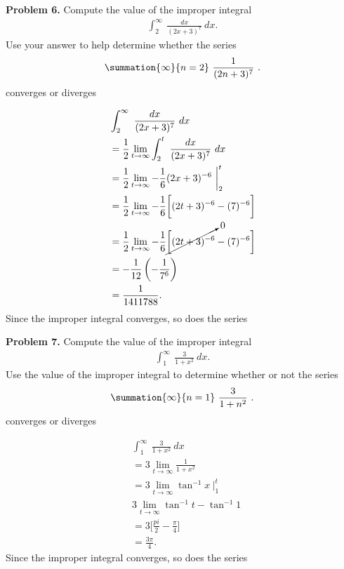 \documentclass{report}
\begin{document}
   \pagebreak \bigbreak \noindent 
   \begin{mdframed}
       \textbf{Problem 6.} Compute the value of the improper integral
       \begin{align*}
           \int_{2}^{\infty}\ \frac{dx}{(2x+3)^{7}}\ dx
       .\end{align*}
       Use your answer to help determine whether the series 
       \begin{align*}
           \summation{\infty}{n=2}\ \frac{1}{(2n+3)^{7}}\ 
       .\end{align*}
       converges or diverges
   \end{mdframed}
   \begin{align*}
       &\int_{2}^{\infty}\ \frac{dx}{(2x+3)^{7}}\ dx \\
       &=\frac{1}{2}\lim\limits_{t \to \infty}{\int_{2}^{t}\ \frac{dx}{(2x+3)^{7}}\ dx} \\
       &=\frac{1}{2}\lim\limits_{t \to \infty}{-\frac{1}{6}(2x+3)^{-6}\ \bigg|_2^{t}} \\
       &=\frac{1}{2}\lim\limits_{t \to \infty}{-\frac{1}{6}\bigg[(2t+3)^{-6} - (7)^{-6}\bigg]} \\
       &=\frac{1}{2}\lim\limits_{t \to \infty}{-\frac{1}{6}\cancelto{0}{\bigg[(2t+3)^{-6}} - (7)^{-6}\bigg]} \\
        &=-\frac{1}{12}\left(-\frac{1}{7^{6}}\right) \\
        &=\frac{1}{1411788}
   .\end{align*}
   \bigbreak \noindent 
   Since the improper integral converges, so does the series


   \pagebreak \bigbreak \noindent 
   \begin{mdframed}
       \textbf{Problem 7.} Compute the value of the improper integral
       \begin{align*}
           \int_{1}^{\infty}\ \frac{3}{1+x^{2}} \ dx
       .\end{align*}
       Use the value of the improper integral to determine whether or not the series
       \begin{align*}
           \summation{\infty}{n=1}\ \frac{3}{1+n^{2}}\ 
       .\end{align*}
       converges or diverges
   \end{mdframed}
   \begin{align*}
       &\int_{1}^{\infty}\ \frac{3}{1+x^{2}}\ dx \\
       &=3\lim\limits_{t \to \infty}{\frac{1}{1+x^{2}}} \\
       &=3\lim\limits_{t \to \infty}{\tan^{-1}{x}}\ \bigg|_1^{t} \\
       &3\lim\limits_{t \to \infty}{\tan^{-1}{t} - \tan^{-1}{1}} \\
       &=3\bigg[\frac{pi}{2} - \frac{\pi}{4}\bigg] \\
       &=\frac{3\pi}{4}
   .\end{align*}
  Since the improper integral converges, so does the series
\end{document}
